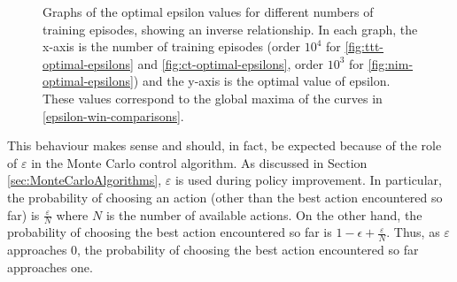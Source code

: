 \documentclass[11pt,a4paper]{report}
\begin{document}
\begin{figure}[htbp]
    \centering
	\caption{Graphs of the optimal epsilon values for different numbers of training episodes, showing an inverse relationship. In each graph, the x-axis is the number of training episodes (order $10^4$ for \ref{fig:ttt-optimal-epsilons} and \ref{fig:ct-optimal-epsilons}, order $10^3$ for \ref{fig:nim-optimal-epsilons}) and the y-axis is the optimal value of epsilon. These values correspond to the global maxima of the curves in \ref{epsilon-win-comparisons}. }
	\label{training-vs-opt-epsilon}
\end{figure}


This behaviour makes sense and should, in fact, be expected because of the role of $\varepsilon$ in the Monte Carlo control algorithm. As discussed in Section \ref{sec:MonteCarloAlgorithms}, $\varepsilon$ is used during policy improvement. In particular, the probability of choosing an action (other than the best action encountered so far) is $\frac{\varepsilon}{N}$ where $N$ is the number of available actions. On the other hand, the probability of choosing the best action encountered so far is  $1 - \epsilon + \frac{\varepsilon}{N}$. Thus, as $\varepsilon$ approaches 0, the probability of choosing the best action encountered so far approaches one.
\end{document}
